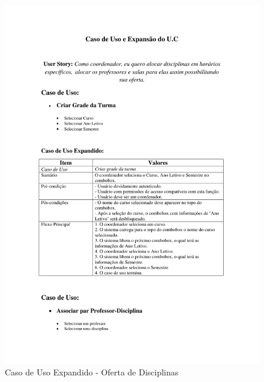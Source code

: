 \documentclass{abnt}
\begin{document}
		\begin{figure}[h]
			\begin{center}
				\includegraphics[bb=1.0in 1.0in 7.5in 10in page=1]{ExpansaoU_C_OfertaDisciplinas.pdf}
				 \caption{Caso de Uso Expandido - Oferta de Disciplinas}
			\end{center}
		\end{figure}
\end{document}
